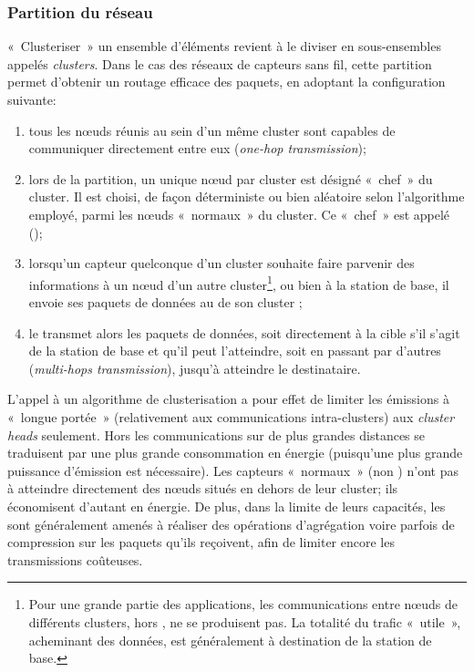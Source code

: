         \subsubsection{Partition du réseau}
«~Clusteriser~» un ensemble d'éléments revient à le diviser en sous-ensembles appelés \textit{clusters}.
Dans le cas des réseaux de capteurs sans fil, cette partition permet d'obtenir un routage efficace des paquets, en adoptant la configuration suivante:
\begin{enumerate}
    \item tous les nœuds réunis au sein d'un même cluster sont capables de communiquer directement entre eux (\textit{one-hop transmission});
    \item lors de la partition, un unique nœud par cluster est désigné «~chef~» du cluster.
        Il est choisi, de façon déterministe ou bien aléatoire selon l'algorithme employé, parmi les nœuds «~normaux~» du cluster.
        Ce «~chef~» est appelé \ch (\CH);
    \item lorsqu'un capteur quelconque d'un cluster souhaite faire parvenir des informations à un nœud d'un autre cluster\footnote{Pour une grande partie des applications, les communications entre nœuds de différents clusters, hors \chs, ne se produisent pas. La totalité du trafic «~utile~», acheminant des données, est généralement à destination de la station de base.}, ou bien à la station de base, il envoie ses paquets de données au \ch de son cluster ;
    \item le \ch transmet alors les paquets de données, soit directement à la cible s'il s'agit de la station de base et qu'il peut l'atteindre, soit en passant par d'autres \chs (\textit{multi-hops transmission}), jusqu'à atteindre le destinataire.
\end{enumerate}
L'appel à un algorithme de clusterisation a pour effet de limiter les émissions à «~longue portée~» (relativement aux communications intra-clusters) aux \textit{cluster heads} seulement.
Hors les communications sur de plus grandes distances se traduisent par une plus grande consommation en énergie (puisqu'une plus grande puissance d'émission est nécessaire).
Les capteurs «~normaux~» (non \chs) n'ont pas à atteindre directement des nœuds situés en dehors de leur cluster; ils économisent d'autant en énergie.
De plus, dans la limite de leurs capacités, les \chs sont généralement amenés à réaliser des opérations d'agrégation voire parfois de compression sur les paquets qu'ils reçoivent, afin de limiter encore les transmissions coûteuses.


